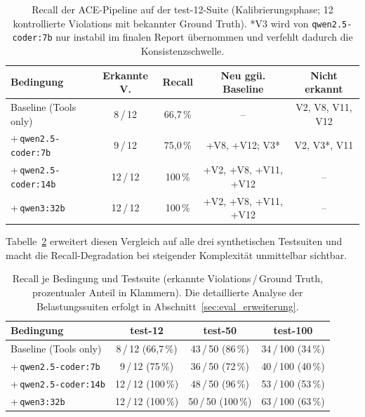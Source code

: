 \begin{table}[htbp]
\centering
\small
\renewcommand{\arraystretch}{1.15}
\begin{tabular}{@{}lcccc@{}}
\toprule
\textbf{Bedingung} & \textbf{Erkannte V.} & \textbf{Recall} & \textbf{Neu ggü. Baseline} & \textbf{Nicht erkannt} \\
\midrule
Baseline (Tools only)         & 8\,/\,12  & 66,7\,\% & --                                  & V2, V8, V11, V12 \\
+\,\texttt{qwen2.5-coder:7b}  & 9\,/\,12  & 75,0\,\% & +V8, +V12; V3*                      & V2, V3*, V11 \\
+\,\texttt{qwen2.5-coder:14b} & 12\,/\,12 & 100\,\%  & +V2, +V8, +V11, +V12                & -- \\
+\,\texttt{qwen3:32b}         & 12\,/\,12 & 100\,\%  & +V2, +V8, +V11, +V12                & -- \\
\bottomrule
\end{tabular}
\caption[Recall-Vergleich je Bedingung und Modell]{Recall der \ac{ACE}-Pipeline auf der test-12-Suite (Kalibrierungsphase; 12 kontrollierte Violations mit bekannter Ground Truth). *V3 wird von \texttt{qwen2.5-coder:7b} nur instabil im finalen Report übernommen und verfehlt dadurch die Konsistenzschwelle.}
\label{tab:recall_modellvergleich}
\end{table}

Tabelle~\ref{tab:recall_suiten_ueberblick} erweitert diesen Vergleich auf alle drei synthetischen Testsuiten und macht die Recall-Degradation bei steigender Komplexität unmittelbar sichtbar.

\begin{table}[htbp]
\centering
\small
\renewcommand{\arraystretch}{1.15}
\begin{tabular}{@{}lccc@{}}
\toprule
\textbf{Bedingung} & \textbf{test-12} & \textbf{test-50} & \textbf{test-100} \\
\midrule
Baseline (Tools only)         & 8\,/\,12 (66{,}7\,\%)  & 43\,/\,50 (86\,\%)  & 34\,/\,100 (34\,\%) \\
+\,\texttt{qwen2.5-coder:7b}  & 9\,/\,12 (75\,\%)      & 36\,/\,50 (72\,\%)  & 40\,/\,100 (40\,\%) \\
+\,\texttt{qwen2.5-coder:14b} & 12\,/\,12 (100\,\%)    & 48\,/\,50 (96\,\%)  & 53\,/\,100 (53\,\%) \\
+\,\texttt{qwen3:32b}         & 12\,/\,12 (100\,\%)    & 50\,/\,50 (100\,\%) & 63\,/\,100 (63\,\%) \\
\bottomrule
\end{tabular}
\caption[Recall-Überblick über alle drei Testsuiten]{Recall je Bedingung und Testsuite (erkannte Violations\,/\,Ground Truth, prozentualer Anteil in Klammern). Die detaillierte Analyse der Belastungssuiten erfolgt in Abschnitt~\ref{sec:eval_erweiterung}.}
\label{tab:recall_suiten_ueberblick}
\end{table}

